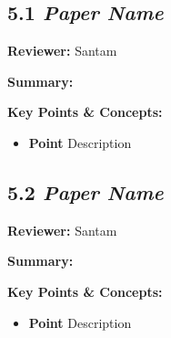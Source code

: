 \documentclass{article}
\begin{document}
\subsection*{5.1 \textit{Paper Name}}

\hspace*{\parindent}\textbf{Reviewer:} Santam

\vspace{0.3cm}

\textbf{Summary:}

\vspace{0.3cm}

\textbf{Key Points \& Concepts:}
\begin{itemize}
  \item \textbf{Point} Description
\end{itemize}

\subsection*{5.2 \textit{Paper Name}}

\hspace*{\parindent}\textbf{Reviewer:} Santam

\vspace{0.3cm}

\textbf{Summary:}

\vspace{0.3cm}

\textbf{Key Points \& Concepts:}
\begin{itemize}
  \item \textbf{Point} Description
\end{itemize}
\end{document}
